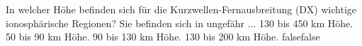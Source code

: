     {In welcher Höhe befinden sich für die Kurzwellen-Fernausbreitung (DX) wichtige ionosphärische Regionen? Sie befinden sich in ungefähr ...}
    {130 bis 450 km Höhe.}
    {50 bis 90 km Höhe.}
    {90 bis 130 km Höhe.}
    {130 bis 200 km Höhe.}
    {false}{false}